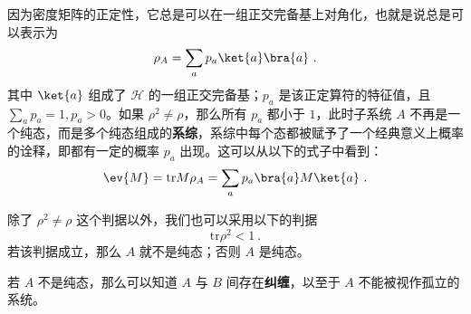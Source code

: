 因为密度矩阵的正定性，它总是可以在一组正交完备基上对角化，也就是说总是可以表示为
\begin{equation}
\rho_A=\sum_a p_a\ket{a}\bra{a}~.
\end{equation}
其中 $\ket{a}$ 组成了 $\mathcal{H}$ 的一组正交完备基；$p_a$ 是该正定算符的特征值，且 $\sum_a p_a=1,p_a>0$。如果 $\rho^2\neq \rho$，那么所有 $p_a$ 都小于 $1$，此时子系统 $A$ 不再是一个纯态，而是多个纯态组成的\textbf{系综}，系综中每个态都被赋予了一个经典意义上概率的诠释，即都有一定的概率 $p_a$ 出现。这可以从以下的式子中看到：
\begin{equation}
\ev{M}=\text{tr} M\rho_A = \sum_a p_a \bra{a}M\ket{a}~.
\end{equation}


除了 $\rho^2\neq \rho$ 这个判据以外，我们也可以采用以下的判据
\begin{equation}\label{eq_partra_2}
\text{tr} \rho^2 <1~.
\end{equation}
若该判据成立，那么 $A$ 就不是纯态；否则 $A$ 是纯态。

若 $A$ 不是纯态，那么可以知道 $A$ 与 $B$ 间存在\textbf{纠缠}，以至于 $A$ 不能被视作孤立的系统。
